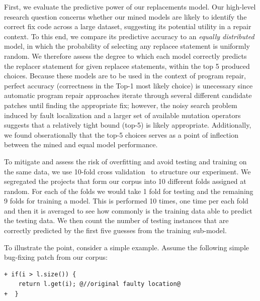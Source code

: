\documentclass[conference]{IEEEtran}
\begin{document}
First, we evaluate the predictive power of our 
replacements model. Our high-level research question concerns whether 
our mined models are likely to identify the correct fix code across a large
dataset, suggesting its potential utility in a repair context.  To this end, we
compare its predictive accuracy to an \emph{equally distributed} model, in which
the probability of selecting any replacee statement is uniformly random. 
We therefore assess the degree to which each model correctly predicts the
replacer statement for given replacee statements, within the top 5 produced
choices.  Because these models are to be used in the context of program repair,
perfect accuracy (correctness in the Top-1 most likely choice) is unecessary since automatic program repair approaches iterate through several different candidate patches until finding the appropriate fix;
however, the noisy search problem induced by fault localization and a larger set
of available mutation operators suggests that a relatively tight bound (top-5)
is likely appropriate.  Additionally, we found obserationally that the top-5
choices serves as a point of inflection between the mined and equal model
performance. 

To mitigate and assess the risk of overfitting and avoid testing and training on
the same data, we use 
10-fold cross validation~\cite{kohavi95} to structure our experiment. 
We segregated the projects that form our corpus into 10 
different folds assigned at random. For each of the 
folds we would take 1 fold for testing and the remaining 9 folds for training a model. 
This is performed 10 times, one time per each fold and then it is 
averaged to see how commonly is the training data able to predict the testing 
data.
We then count the number of testing instances that are correctly predicted 
by the first five guesses from the training sub-model.   


To illustrate the point, consider a simple example. Assume the following
simple bug-fixing patch from our corpus: 

\begin{lstlisting}[frame=single,style=base]
+ if(i > l.size()) {
    return l.get(i); @//original faulty location@
+  }    
\end{lstlisting}
\end{document}
